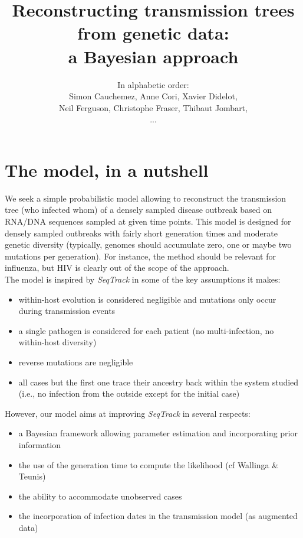 \documentclass[10pt]{article}
\author{In alphabetic order: \\Simon Cauchemez, Anne Cori, Xavier Didelot, \\Neil Ferguson, Christophe Fraser, Thibaut Jombart,\\...}
\title{Reconstructing transmission trees from genetic data: \\a Bayesian approach}
\begin{document}
\maketitle

\section*{The model, in a nutshell}
We seek a simple probabilistic model allowing to reconstruct the transmission tree (who infected whom) of a densely sampled disease outbreak based on RNA/DNA sequences sampled at given time points.
This model is designed for densely sampled outbreaks with fairly short generation times and moderate genetic diversity (typically, genomes should accumulate zero, one or maybe two mutations per generation).
For instance, the method should be relevant for influenza, but HIV is clearly out of the scope of the approach.
\\

The model is inspired by \textit{SeqTrack} in some of the key assumptions it makes: 
\begin{itemize}
\item within-host evolution is considered negligible and mutations only occur during transmission events
\item a single pathogen is considered for each patient (no multi-infection, no within-host diversity)
\item reverse mutations are negligible
\item all cases but the first one trace their ancestry back within the system studied (i.e., no infection from the outside except for the initial case)
\end{itemize}

However, our model aims at improving \textit{SeqTrack} in several respects:
\begin{itemize}
\item a Bayesian framework allowing parameter estimation and incorporating prior information
\item the use of the generation time to compute the likelihood (cf Wallinga \& Teunis)
\item the ability to accommodate unobserved cases
\item the incorporation of infection dates in the transmission model (as augmented data)
\end{itemize}
\end{document}
